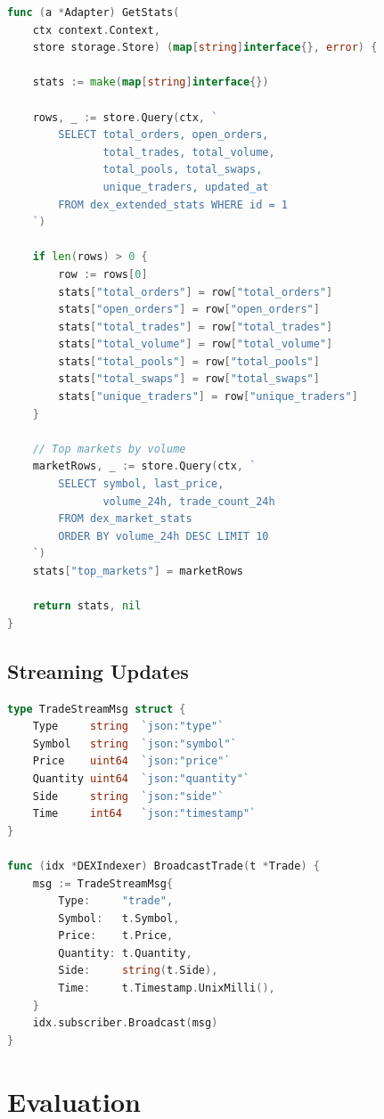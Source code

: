 \documentclass[11pt,twocolumn]{article}
\begin{document}
\begin{lstlisting}[language=Go,caption={DEX statistics computation}]
func (a *Adapter) GetStats(
    ctx context.Context,
    store storage.Store) (map[string]interface{}, error) {

    stats := make(map[string]interface{})

    rows, _ := store.Query(ctx, `
        SELECT total_orders, open_orders,
               total_trades, total_volume,
               total_pools, total_swaps,
               unique_traders, updated_at
        FROM dex_extended_stats WHERE id = 1
    `)

    if len(rows) > 0 {
        row := rows[0]
        stats["total_orders"] = row["total_orders"]
        stats["open_orders"] = row["open_orders"]
        stats["total_trades"] = row["total_trades"]
        stats["total_volume"] = row["total_volume"]
        stats["total_pools"] = row["total_pools"]
        stats["total_swaps"] = row["total_swaps"]
        stats["unique_traders"] = row["unique_traders"]
    }

    // Top markets by volume
    marketRows, _ := store.Query(ctx, `
        SELECT symbol, last_price,
               volume_24h, trade_count_24h
        FROM dex_market_stats
        ORDER BY volume_24h DESC LIMIT 10
    `)
    stats["top_markets"] = marketRows

    return stats, nil
}
\end{lstlisting}

\subsection{Streaming Updates}

\begin{lstlisting}[language=Go,caption={Trade stream message}]
type TradeStreamMsg struct {
    Type     string  `json:"type"`
    Symbol   string  `json:"symbol"`
    Price    uint64  `json:"price"`
    Quantity uint64  `json:"quantity"`
    Side     string  `json:"side"`
    Time     int64   `json:"timestamp"`
}

func (idx *DEXIndexer) BroadcastTrade(t *Trade) {
    msg := TradeStreamMsg{
        Type:     "trade",
        Symbol:   t.Symbol,
        Price:    t.Price,
        Quantity: t.Quantity,
        Side:     string(t.Side),
        Time:     t.Timestamp.UnixMilli(),
    }
    idx.subscriber.Broadcast(msg)
}
\end{lstlisting}

\section{Evaluation}
\end{document}
